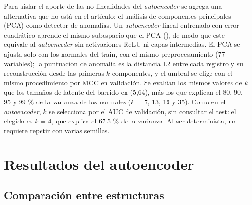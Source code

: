 \documentclass[
  spanish,
  11pt,
]{article}
\begin{document}
Para aislar el aporte de las no linealidades del \emph{autoencoder} se agrega una alternativa que no está
en el artículo: el análisis de componentes principales (PCA) como detector de anomalías. Un
\emph{autoencoder} lineal entrenado con error cuadrático aprende el mismo subespacio que el PCA
(), de modo que este equivale al \emph{autoencoder} sin activaciones ReLU ni capas
intermedias. El PCA se ajusta solo con los normales del train, con el mismo preprocesamiento (77
variables); la puntuación de anomalía es la distancia L2 entre cada registro y su reconstrucción desde
las primeras \(k\) componentes, y el umbral se elige con el mismo procedimiento por MCC en validación.
Se evalúan los mismos valores de \(k\) que los tamaños de latente del barrido en (5,64), más los que
explican el 80, 90, 95 y 99 \% de la varianza de los normales (\(k\) = 7, 13, 19 y 35). Como en el
\emph{autoencoder}, \(k\) se selecciona por el AUC de validación, sin consultar el test: el elegido es
\(k\) = 4, que explica el 67.5 \% de la varianza. Al
ser determinista, no requiere repetir con varias semillas.

\section{Resultados del autoencoder}\label{sec:resultados-ae}

\subsection{Comparación entre estructuras}\label{sec:estructuras}

\begin{table}[!h]
\centering
\caption{\label{tab:ae-estructuras}Mejor latente por estructura: réplica (media ± desviación estándar, 10 semillas) frente a la Tabla 5 de Song et al. (2021, 20 corridas).}
\centering
{}
\end{table}
\end{document}

